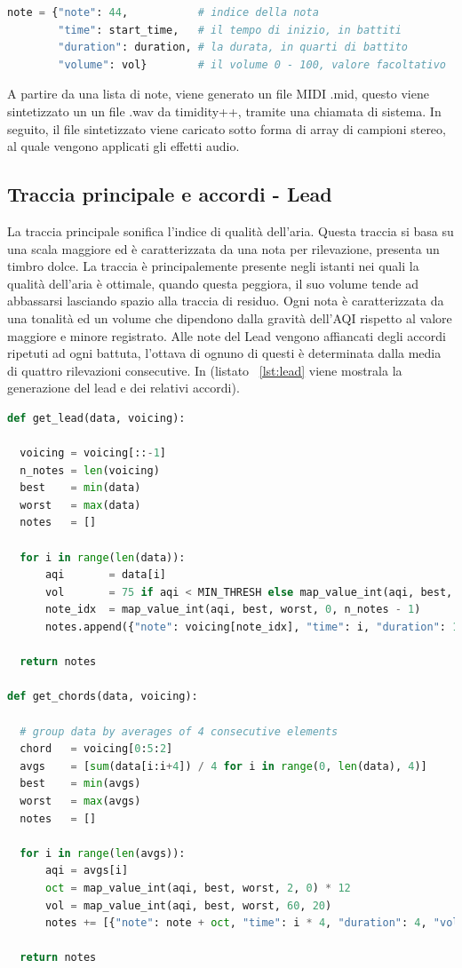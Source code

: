 \begin{lstlisting}[language=Python,caption={Composizione di una nota.},label={lst:note}]
note = {"note": 44,           # indice della nota
        "time": start_time,   # il tempo di inizio, in battiti 
        "duration": duration, # la durata, in quarti di battito
        "volume": vol}        # il volume 0 - 100, valore facoltativo
\end{lstlisting}
A partire da una lista di note, viene generato un file MIDI .mid, questo viene sintetizzato un un file .wav da timidity++, tramite una chiamata di sistema.
In seguito, il file sintetizzato viene caricato sotto forma di array di campioni stereo, al quale vengono applicati gli effetti audio.



\subsection{Traccia principale e accordi - Lead}
La traccia principale sonifica l'indice di qualità dell'aria.
Questa traccia si basa su una scala maggiore ed è caratterizzata da una nota per rilevazione, presenta un timbro dolce.
La traccia è principalemente presente negli istanti nei quali la qualità dell'aria è ottimale, quando questa peggiora,
il suo volume tende ad abbassarsi lasciando spazio alla traccia di residuo.
Ogni nota è caratterizzata da una tonalità ed un volume che dipendono dalla gravità dell'AQI rispetto al valore maggiore e minore registrato.
Alle note del Lead vengono affiancati degli accordi ripetuti ad ogni battuta, l'ottava di ognuno di questi è determinata dalla media di quattro rilevazioni consecutive. In (listato ~\ref{lst:lead} viene mostrala la generazione del lead e dei relativi accordi).
\newpage

\begin{lstlisting}[language=Python,caption={Generazione della traccia principale e accordi.},label={lst:lead}]
def get_lead(data, voicing):

  voicing = voicing[::-1]
  n_notes = len(voicing)
  best    = min(data)
  worst   = max(data)
  notes   = []

  for i in range(len(data)):
      aqi       = data[i]
      vol       = 75 if aqi < MIN_THRESH else map_value_int(aqi, best, worst, 50, 25)
      note_idx  = map_value_int(aqi, best, worst, 0, n_notes - 1)
      notes.append({"note": voicing[note_idx], "time": i, "duration": 1, "volume": vol })

  return notes

def get_chords(data, voicing):

  # group data by averages of 4 consecutive elements
  chord   = voicing[0:5:2]
  avgs    = [sum(data[i:i+4]) / 4 for i in range(0, len(data), 4)]
  best    = min(avgs)
  worst   = max(avgs)
  notes   = []
  
  for i in range(len(avgs)):
      aqi = avgs[i]
      oct = map_value_int(aqi, best, worst, 2, 0) * 12
      vol = map_value_int(aqi, best, worst, 60, 20)
      notes += [{"note": note + oct, "time": i * 4, "duration": 4, "volume": vol} for note in chord]

  return notes
\end{lstlisting}

